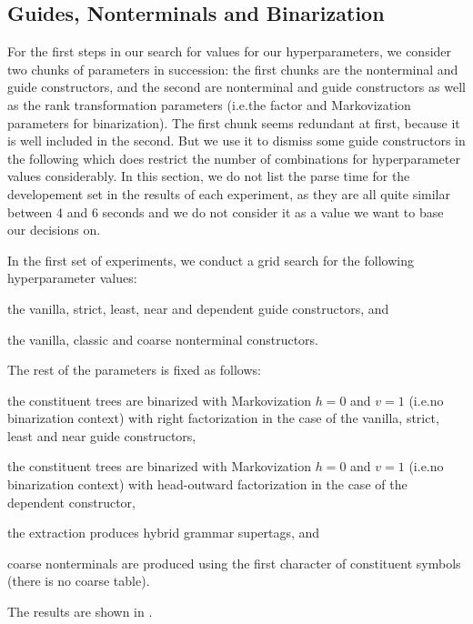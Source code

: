\documentclass[../../document.tex]{subfiles}
\begin{document}
    \subsection{Guides, Nonterminals and Binarization}
    For the first steps in our search for values for our hyperparameters, we consider two chunks of parameters in succession: the first chunks are the nonterminal and guide constructors, and the second are nonterminal and guide constructors as well as the rank transformation parameters (i.e.\@ the factor and Markovization parameters for binarization).
    The first chunk seems redundant at first, because it is well included in the second.
    But we use it to dismiss some guide constructors in the following which does restrict the number of combinations for hyperparameter values considerably.
    In this section, we do not list the parse time for the developement set in the results of each experiment, as they are all quite similar between 4 and 6 seconds and we do not consider it as a value we want to base our decisions on.

    In the first set of experiments, we conduct a grid search for the following hyperparameter values:
    \begin{compactitem}
        \item the vanilla, strict, least, near and dependent guide constructors, and
        \item the vanilla, classic and coarse nonterminal constructors.
    \end{compactitem}
    The rest of the parameters is fixed as follows:
    \begin{compactitem}
        \item the constituent trees are binarized with Markovization \(h=0\) and \(v=1\) (i.e.\@ no binarization context) with right factorization in the case of the vanilla, strict, least and near guide constructors,
        \item the constituent trees are binarized with Markovization \(h=0\) and \(v=1\) (i.e.\@ no binarization context) with head-outward factorization in the case of the dependent constructor,
        \item the extraction produces hybrid grammar supertags, and
        \item coarse nonterminals are produced using the first character of constituent symbols (there is no coarse table).
    \end{compactitem}
    The results are shown in .
    
\end{document}
